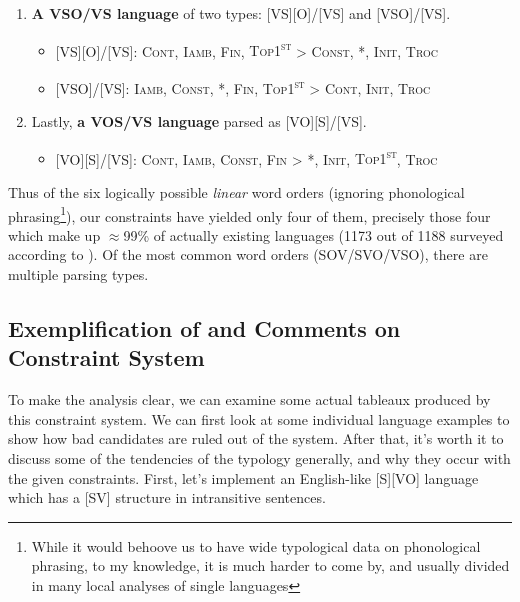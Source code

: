 \documentclass{article}
\newcommand{\cont}{\textsc{Cont}}
\newcommand{\iamb}{\textsc{Iamb}}
\newcommand{\cons}{\textsc{Const}}
\newcommand{\topf}{\textsc{Top1\textsuperscript{st}}}
\newcommand{\nophi}{\textsc{*\textphi}}
\newcommand{\finphi}{\textsc{Fin\textphi}}
\newcommand{\initphi}{\textsc{Init\textphi}}
\newcommand{\troc}{\textsc{Troc}}
\begin{document}
\begin{enumerate}
\begin{itemize}
\item {} [S][OV]/[VS]: \cont, \iamb, \cons, {\topf} {\textgreater} \nophi, {\finphi} {\textgreater} \initphi, \troc
\end{itemize}
\item \textbf{A VSO/VS language} of two types: [VS][O]/[VS] and [VSO]/[VS].

\begin{itemize}
\item {}[VS][O]/[VS]: \cont, \iamb, \finphi, {\topf} {\textgreater} \cons, \nophi, \initphi, \troc
\item {}[VSO]/[VS]: \iamb, \cons, \nophi, \finphi, {\topf} {\textgreater} \cont, \initphi, \troc
\end{itemize}

\item Lastly, \textbf{a VOS/VS language} parsed as [VO][S]/[VS].

\begin{itemize}
\item {}[VO][S]/[VS]: \cont, \iamb, \cons, {\finphi} {\textgreater} \nophi, \initphi, \topf, \troc
\end{itemize}

\end{enumerate}

Thus of the six logically possible \emph{linear} word orders (ignoring phonological phrasing\footnote{While it would behoove us to have wide typological data on phonological phrasing, to my knowledge, it is much harder to come by, and usually divided in many local analyses of single languages}), our constraints have yielded only four of them, precisely those four which make up $\approx$99\% of actually existing languages (1173 out of 1188 surveyed according to \textcite{dryer13}).
Of the most common word orders (SOV/SVO/VSO), there are multiple parsing types.


\subsection{Exemplification of and Comments on Constraint System}

To make the analysis clear, we can examine some actual tableaux produced by this constraint system.
We can first look at some individual language examples to show how bad candidates are ruled out of the system.
After that, it's worth it to discuss some of the tendencies of the typology generally, and why they occur with the given constraints.
First, let's implement an English-like [S][VO] language which has a [SV] structure in intransitive sentences.
\end{document}

